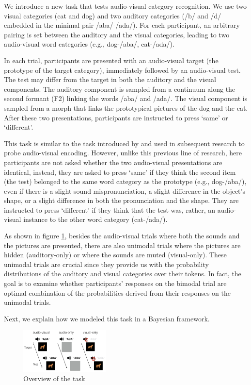 \documentclass[10pt,letterpaper]{article}
\begin{document}
We introduce a new task that tests audio-visual category recognition. We use two visual categories (cat and dog) and two auditory categories (/b/ and /d/ embedded in the minimal pair /aba/-/ada/). For each participant, an arbitrary pairing is set between the auditory and the visual categories, leading to two audio-visual word categories (e.g., dog-/aba/, cat-/ada/). 

In each trial, participants are presented with an audio-visual target (the prototype of the target category), immediately followed by an audio-visual test. 
The test may differ from the target in both the auditory and the visual components. The auditory component is sampled from a continuum along the second formant (F2) linking the words /aba/ and /ada/. The visual component is sampled from a morph that links the prototypical pictures of the dog and the cat.  After these two presentations, participants are instructed to press `same' or `different'. 

This task is similar to the task introduced by  and used in subsequent research to probe audio-visual encoding. However, unlike this previous line of research, here participants are not asked whether the two audio-visual presentations are identical, instead, they are asked to press `same' if they think the second item (the test) belonged to the same word category as the prototype (e.g.,  dog-/aba/), even if there is a slight sound mispronunciation,  a slight difference in the object’s shape, or a slight difference in both the pronunciation and the shape. They are instructed to press `different' if they think that the test was, rather, an audio-visual instance to the other word category (cat-/ada/).

As shown in figure \ref{fig:task}, besides the audio-visual trials where both the sounds and the pictures are presented, there are also unimodal trials where the pictures are hidden (auditory-only) or where the sounds are muted (visual-only). These unimodal trials are crucial since they provide us with the probability distributions of the auditory and visual categories over their tokens. In fact, the goal is to examine whether participants' responses on the bimodal trial are optimal combination of the probabilities derived from their responses on the unimodal trials. 

Next, we explain how we modeled this task in a Bayesian framework. 

\begin{figure}[tp]
\centering
\includegraphics[width=0.4\textwidth]{task1.png}
\caption{Overview of the task}
\label{fig:task}
\end{figure}
\end{document}

